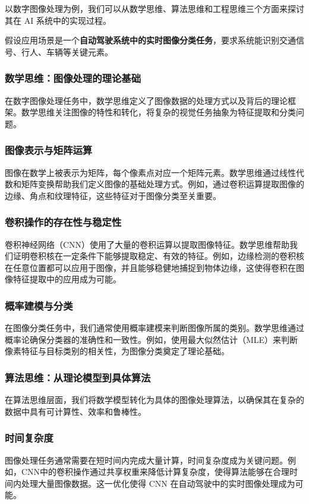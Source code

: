 以数字图像处理为例，我们可以从数学思维、算法思维和工程思维三个方面来探讨其在 AI 系统中的实现过程。

假设应用场景是一个{\bf 自动驾驶系统中的实时图像分类任务}，要求系统能识别交通信号、行人、车辆等关键元素。

\subsubsection{  数学思维：图像处理的理论基础}

在数字图像处理任务中，数学思维定义了图像数据的处理方式以及背后的理论框架。数学思维关注图像的特性和转化，将复杂的视觉任务抽象为特征提取和分类问题。

\subsubsection*{图像表示与矩阵运算}

图像在数学上被表示为矩阵，每个像素点对应一个矩阵元素。数学思维通过线性代数和矩阵变换帮助我们定义图像的基础处理方式。例如，通过卷积运算提取图像的边缘、角点和纹理特征，这些特征对于图像分类至关重要。

\subsubsection*{卷积操作的存在性与稳定性}
卷积神经网络（CNN）使用了大量的卷积运算以提取图像特征。数学思维帮助我们证明卷积核在一定条件下能够提取稳定、有效的特征。例如，边缘检测的卷积核在任意位置都可以应用于图像，并且能够稳健地捕捉到物体边缘，这使得卷积在图像特征提取中的应用成为可能。

\subsubsection*{概率建模与分类}

在图像分类任务中，我们通常使用概率建模来判断图像所属的类别。数学思维通过概率论确保分类器的准确性和一致性。例如，使用最大似然估计（MLE）来判断像素特征与目标类别的相关性，为图像分类奠定了理论基础。

\subsubsection{ 算法思维：从理论模型到具体算法}

在算法思维层面，我们将数学模型转化为具体的图像处理算法，以确保其在复杂的数据中具有可计算性、效率和鲁棒性。

\subsubsection*{时间复杂度}
图像处理任务通常需要在短时间内完成大量计算，时间复杂度成为关键问题。例如，CNN中的卷积操作通过共享权重来降低计算复杂度，使得算法能够在合理时间内处理大量图像数据。这一优化使得 CNN 在自动驾驶中的实时图像处理成为可能。

